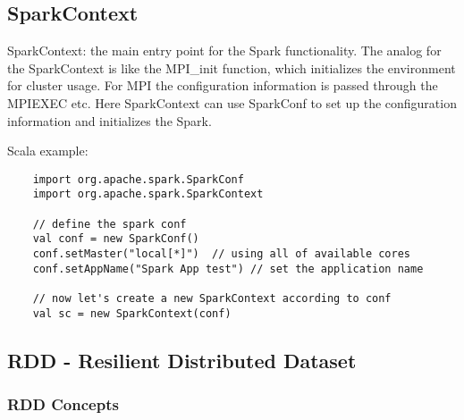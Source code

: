\documentclass[notheorems, aspectratio=54]{beamer}
\begin{document}
\subsection{SparkContext}
\begin{frame}[fragile]

   \begin{block}{SparkContext: the main entry point for the Spark functionality.}
   The analog for the SparkContext  is like the MPI\_init function, which initializes the environment for cluster usage. 
   For MPI the configuration information is passed through the MPIEXEC etc. Here SparkContext can use SparkConf
   to set up the configuration information and initializes the Spark.
   \end{block}
   
   Scala example:
   \begin{verbatim}
    import org.apache.spark.SparkConf
    import org.apache.spark.SparkContext

    // define the spark conf
    val conf = new SparkConf()
    conf.setMaster("local[*]")  // using all of available cores 
    conf.setAppName("Spark App test") // set the application name

    // now let's create a new SparkContext according to conf
    val sc = new SparkContext(conf)
   \end{verbatim}     
  
\end{frame}

\subsection{RDD - Resilient Distributed Dataset}
\subsubsection{RDD Concepts}
\begin{frame}


 
  
\end{frame}


\begin{frame}

 
\end{frame}


\begin{frame}

 

\end{frame}


\begin{frame}

  
\end{frame}

\begin{frame}

  
\end{frame}
\end{document}
